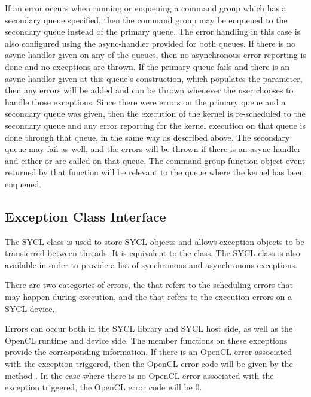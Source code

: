 If an error occurs when running or enqueuing a command group which has
a secondary queue specified, then the command group may be enqueued
to the secondary queue instead of the primary queue. The error handling in this
case is also configured using the \gls{async-handler} provided for both
queues. If there is no \gls{async-handler} given on any of the queues,
then no asynchronous error reporting is done and no exceptions are thrown. If
the primary queue fails and there is an \gls{async-handler} given at
this queue's construction, which populates the 
parameter, then any errors will be added and can be thrown whenever the user
chooses to handle those exceptions. Since there were errors on the primary
queue and a secondary queue was given, then the execution of the kernel is
re-scheduled to the secondary queue and any error reporting for the kernel
execution on that queue is done through that queue, in the same way as
described above. The secondary queue may fail as well, and the errors will be
thrown if there is an \gls{async-handler} and either
 or  are called on that queue.
The \gls{command-group-function-object} event returned by that function will be
relevant to the queue where the kernel has been enqueued.

\subsection{Exception Class Interface}
\label{subsec:exception.class}


The SYCL 
class is used to store SYCL  objects and allows
exception objects to be transferred between threads. It is equivalent to the
 class. The SYCL 
class is also available in order to provide a list of synchronous and
asynchronous exceptions.

There are two categories of errors, the 
that refers to the scheduling errors that may happen during execution, and the
 that refers to the execution errors on a SYCL device.

Errors can occur both in the SYCL library and SYCL host side, as well as the
OpenCL runtime and device side. The member functions on these exceptions provide the
corresponding information.
If there is an OpenCL error associated with the exception triggered, then the
OpenCL error code will be given by the method .
In the case where there is no OpenCL error associated with the exception
triggered, the OpenCL error code will be 0.

